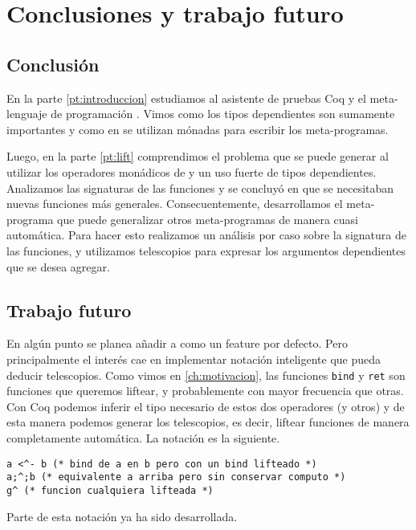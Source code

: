 \chapter{Conclusiones y trabajo futuro}\label{ch:conclusion}

\section{Conclusión}\label{sc:conclusion}

En la parte \ref{pt:introduccion} estudiamos al asistente de pruebas Coq y el meta-lenguaje de programación \mtac. Vimos como los tipos dependientes son sumamente importantes y como en \mtac se utilizan mónadas para escribir los meta-programas.

Luego, en la parte \ref{pt:lift} comprendimos el problema que se puede generar al utilizar los operadores monádicos de \mtac y un uso fuerte de tipos dependientes. Analizamos las signaturas de las funciones y se concluyó en que se necesitaban nuevas funciones más generales.
Consecuentemente, desarrollamos el meta-programa \lift que puede generalizar otros meta-programas de manera cuasi automática. Para hacer esto realizamos un análisis por caso sobre la signatura de las funciones, y utilizamos telescopios para expresar los argumentos dependientes que se desea agregar.

\section{Trabajo futuro}\label{sc:futuro}

En algún punto se planea añadir \lift a \mtac como un feature por defecto. Pero principalmente el interés cae en implementar notación inteligente que pueda deducir telescopios. Como vimos en \ref{ch:motivacion}, las funciones \lstinline{bind} y \lstinline{ret} son funciones que queremos liftear, y probablemente con mayor frecuencia que otras. Con Coq podemos inferir el tipo necesario de estos dos operadores (y otros) y de esta manera podemos generar los telescopios, es decir, liftear funciones de manera completamente automática.
La notación es la siguiente.

\begin{lstlisting}
a <^- b (* bind de a en b pero con un bind lifteado *)
a;^;b (* equivalente a arriba pero sin conservar computo *)
g^ (* funcion cualquiera lifteada *)
\end{lstlisting}

Parte de esta notación ya ha sido desarrollada.